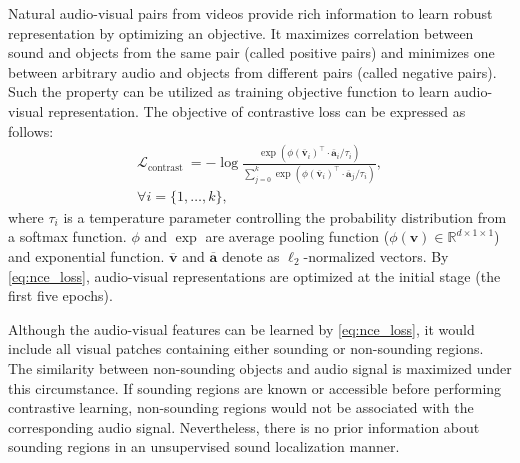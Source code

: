 Natural audio-visual pairs from videos provide rich information to learn robust representation by optimizing an objective. 
% 
It maximizes correlation between sound and objects from the same pair (called positive pairs) and minimizes one between arbitrary audio and objects from different pairs (called negative pairs). 
% 
Such the property can be utilized as training objective function to learn audio-visual representation.
% 
The objective of contrastive loss can be expressed as follows: 
\begin{equation}
\begin{gathered}
\label{eq:nce_loss}
\mathcal{L}_{\text {contrast }}=-\log \frac{\exp \left(\phi(\overline{\mathbf{v}}_{i})^{\top} \cdot \overline{\mathbf{a}}_{i} / \tau_i\right)}{\sum_{j=0}^{k} \exp \left(\phi(\overline{\mathbf{v}}_{i})^{\top} \cdot \overline{\mathbf{a}}_{j} / \tau_i\right)}, \\
\forall i=\{1, \ldots,k\},
\end{gathered}
\end{equation}
where $\tau_i$ is a temperature parameter controlling the probability distribution from a softmax function. 
% 
$\phi$ and $\exp$ are average pooling function ($\phi(\mathbf{v}) \in \mathbb{R}^{d \times 1 \times 1}$) and exponential function. 
% 
$\overline{\mathbf{v}}$ and $\overline{\mathbf{a}}$ denote as $\ell_{2}$-normalized vectors.
% 
By \eqref{eq:nce_loss}, audio-visual representations are optimized at the initial stage (\eg the first five epochs).


Although the audio-visual features can be learned by \eqref{eq:nce_loss}, it would include all visual patches containing either sounding or non-sounding regions. 
% 
The similarity between non-sounding objects and audio signal is maximized under this circumstance. 
% 
If sounding regions are known or accessible before performing contrastive learning, non-sounding regions would not be associated with the corresponding audio signal. 
% 
Nevertheless, there is no prior information about sounding regions in an unsupervised sound localization manner. 
% 


